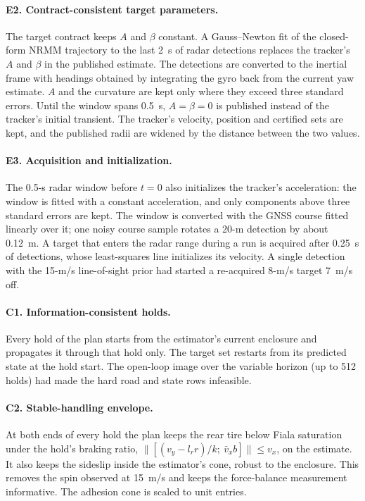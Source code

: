 \documentclass[11pt]{article}
\begin{document}
\paragraph{E2. Contract-consistent target parameters.} The target contract
keeps $A$ and $\beta$ constant. A Gauss--Newton fit of the closed-form NRMM
trajectory to the last 2~s of radar detections replaces the tracker's $A$ and
$\beta$ in the published estimate. The detections are converted to the
inertial frame with headings obtained by integrating the gyro back from the
current yaw estimate. $A$ and the curvature are kept only where they exceed
three standard errors. Until the window spans 0.5~s, $A=\beta=0$ is published
instead of the tracker's initial transient. The tracker's velocity, position
and certified sets are kept, and the published radii are widened by the
distance between the two values.

\paragraph{E3. Acquisition and initialization.} The 0.5-s radar window before
$t=0$ also initializes the tracker's acceleration: the window is fitted with a
constant acceleration, and only components above three standard errors are
kept. The window is converted with the GNSS course fitted linearly over it;
one noisy course sample rotates a 20-m detection by about 0.12~m. A target
that enters the radar range during a run is acquired after
0.25~s of detections, whose least-squares line initializes its velocity. A
single detection with the 15-m/s line-of-sight prior had started a re-acquired
8-m/s target 7~m/s off.

\paragraph{C1. Information-consistent holds.} Every hold of the plan starts
from the estimator's current enclosure and propagates it through that hold
only. The target set restarts from its predicted state at the hold start.
The open-loop image over the variable horizon (up to 512 holds) had made the
hard road and state rows infeasible.

\paragraph{C2. Stable-handling envelope.} At both ends of every hold the plan
keeps the rear tire below Fiala saturation under the hold's braking ratio,
$\|[(v_y-l_rr)/k;\ \bar v_xb]\|\le v_x$, on the estimate. It also keeps the
sideslip inside the estimator's cone, robust to the enclosure. This removes
the spin observed at 15~m/s and keeps the force-balance measurement
informative. The adhesion cone is scaled to unit entries.
\end{document}
